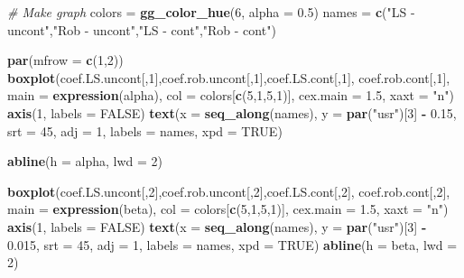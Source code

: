 \documentclass[]{book}
\newenvironment{Shaded}{\begin{snugshade}}{\end{snugshade}}
\newcommand{\CommentTok}[1]{\textcolor[rgb]{0.56,0.35,0.01}{\textit{#1}}}
\newcommand{\DataTypeTok}[1]{\textcolor[rgb]{0.13,0.29,0.53}{#1}}
\newcommand{\DecValTok}[1]{\textcolor[rgb]{0.00,0.00,0.81}{#1}}
\newcommand{\FloatTok}[1]{\textcolor[rgb]{0.00,0.00,0.81}{#1}}
\newcommand{\KeywordTok}[1]{\textcolor[rgb]{0.13,0.29,0.53}{\textbf{#1}}}
\newcommand{\NormalTok}[1]{#1}
\newcommand{\OperatorTok}[1]{\textcolor[rgb]{0.81,0.36,0.00}{\textbf{#1}}}
\newcommand{\OtherTok}[1]{\textcolor[rgb]{0.56,0.35,0.01}{#1}}
\newcommand{\StringTok}[1]{\textcolor[rgb]{0.31,0.60,0.02}{#1}}
\theoremstyle{definition}
\theoremstyle{definition}
\theoremstyle{definition}
\theoremstyle{remark}
\begin{document}
\begin{Shaded}
\begin{Highlighting}[]
\CommentTok{# Make graph}
\NormalTok{colors =}\StringTok{ }\KeywordTok{gg_color_hue}\NormalTok{(}\DecValTok{6}\NormalTok{, }\DataTypeTok{alpha =} \FloatTok{0.5}\NormalTok{)}
\NormalTok{names =}\StringTok{ }\KeywordTok{c}\NormalTok{(}\StringTok{"LS - uncont"}\NormalTok{,}\StringTok{"Rob - uncont"}\NormalTok{,}\StringTok{"LS - cont"}\NormalTok{,}\StringTok{"Rob - cont"}\NormalTok{)}

\KeywordTok{par}\NormalTok{(}\DataTypeTok{mfrow =} \KeywordTok{c}\NormalTok{(}\DecValTok{1}\NormalTok{,}\DecValTok{2}\NormalTok{))}
\KeywordTok{boxplot}\NormalTok{(coef.LS.uncont[,}\DecValTok{1}\NormalTok{],coef.rob.uncont[,}\DecValTok{1}\NormalTok{],coef.LS.cont[,}\DecValTok{1}\NormalTok{],}
\NormalTok{        coef.rob.cont[,}\DecValTok{1}\NormalTok{], }\DataTypeTok{main =} \KeywordTok{expression}\NormalTok{(alpha), }
        \DataTypeTok{col =}\NormalTok{ colors[}\KeywordTok{c}\NormalTok{(}\DecValTok{5}\NormalTok{,}\DecValTok{1}\NormalTok{,}\DecValTok{5}\NormalTok{,}\DecValTok{1}\NormalTok{)], }
        \DataTypeTok{cex.main =} \FloatTok{1.5}\NormalTok{, }\DataTypeTok{xaxt =} \StringTok{"n"}\NormalTok{)}
\KeywordTok{axis}\NormalTok{(}\DecValTok{1}\NormalTok{, }\DataTypeTok{labels =} \OtherTok{FALSE}\NormalTok{)}
\KeywordTok{text}\NormalTok{(}\DataTypeTok{x =} \KeywordTok{seq_along}\NormalTok{(names), }\DataTypeTok{y =} \KeywordTok{par}\NormalTok{(}\StringTok{"usr"}\NormalTok{)[}\DecValTok{3}\NormalTok{] }\OperatorTok{-}\StringTok{ }\FloatTok{0.15}\NormalTok{, }\DataTypeTok{srt =} \DecValTok{45}\NormalTok{, }\DataTypeTok{adj =} \DecValTok{1}\NormalTok{,}
     \DataTypeTok{labels =}\NormalTok{ names, }\DataTypeTok{xpd =} \OtherTok{TRUE}\NormalTok{)}

\KeywordTok{abline}\NormalTok{(}\DataTypeTok{h =}\NormalTok{ alpha, }\DataTypeTok{lwd =} \DecValTok{2}\NormalTok{)}

\KeywordTok{boxplot}\NormalTok{(coef.LS.uncont[,}\DecValTok{2}\NormalTok{],coef.rob.uncont[,}\DecValTok{2}\NormalTok{],coef.LS.cont[,}\DecValTok{2}\NormalTok{],}
\NormalTok{        coef.rob.cont[,}\DecValTok{2}\NormalTok{], }\DataTypeTok{main =} \KeywordTok{expression}\NormalTok{(beta), }
        \DataTypeTok{col =}\NormalTok{ colors[}\KeywordTok{c}\NormalTok{(}\DecValTok{5}\NormalTok{,}\DecValTok{1}\NormalTok{,}\DecValTok{5}\NormalTok{,}\DecValTok{1}\NormalTok{)], }
        \DataTypeTok{cex.main =} \FloatTok{1.5}\NormalTok{, }\DataTypeTok{xaxt =} \StringTok{"n"}\NormalTok{)}
\KeywordTok{axis}\NormalTok{(}\DecValTok{1}\NormalTok{, }\DataTypeTok{labels =} \OtherTok{FALSE}\NormalTok{)}
\KeywordTok{text}\NormalTok{(}\DataTypeTok{x =} \KeywordTok{seq_along}\NormalTok{(names), }\DataTypeTok{y =} \KeywordTok{par}\NormalTok{(}\StringTok{"usr"}\NormalTok{)[}\DecValTok{3}\NormalTok{] }\OperatorTok{-}\StringTok{ }\FloatTok{0.015}\NormalTok{, }\DataTypeTok{srt =} \DecValTok{45}\NormalTok{, }\DataTypeTok{adj =} \DecValTok{1}\NormalTok{,}
     \DataTypeTok{labels =}\NormalTok{ names, }\DataTypeTok{xpd =} \OtherTok{TRUE}\NormalTok{)}
\KeywordTok{abline}\NormalTok{(}\DataTypeTok{h =}\NormalTok{ beta, }\DataTypeTok{lwd =} \DecValTok{2}\NormalTok{)}
\end{Highlighting}
\end{Shaded}
\end{document}
